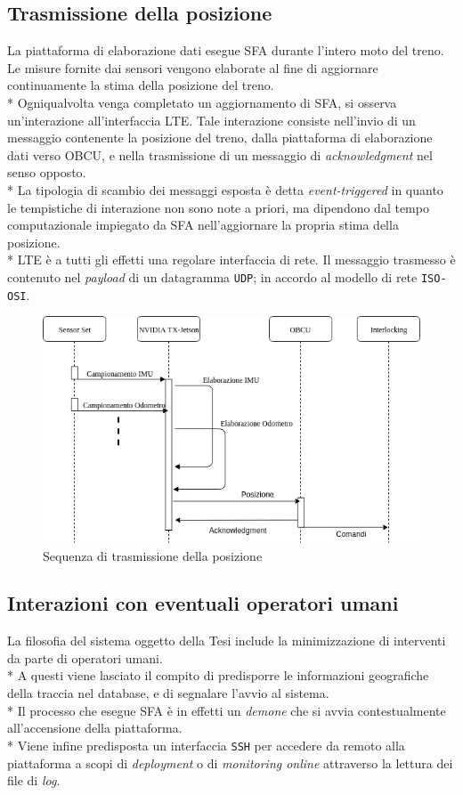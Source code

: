 	\subsection{Trasmissione della posizione}
	La piattaforma di elaborazione dati esegue SFA durante l'intero moto del treno. Le misure fornite dai sensori vengono elaborate al fine di aggiornare continuamente la stima della posizione del treno.\\*
	Ogniqualvolta venga completato un aggiornamento di SFA, si osserva un'interazione all'interfaccia LTE. Tale interazione consiste nell'invio di un messaggio contenente la posizione del treno, dalla piattaforma di elaborazione dati verso OBCU, e nella trasmissione di un messaggio di \emph{acknowledgment} nel senso opposto.\\*
	La tipologia di scambio dei messaggi esposta \`e detta \emph{event-triggered} \cite{evttimetriggered} in quanto le tempistiche di interazione non sono note a priori, ma dipendono dal tempo computazionale impiegato da SFA nell'aggiornare la propria stima della posizione.\\*
	LTE \`e a tutti gli effetti una regolare interfaccia di rete. Il messaggio trasmesso \`e contenuto nel \emph{payload} di un datagramma \texttt{UDP}; in accordo al modello di rete \texttt{ISO-OSI}. \cite{libroreti}
	\begin{figure}[h]
		\centering
		\includegraphics[width=0.7\linewidth]{img/seqdiag2}
		\caption{Sequenza di trasmissione della posizione}
		\label{fig:seqdiag2}
	\end{figure}
	\subsection{Interazioni con eventuali operatori umani}
	La filosofia del sistema oggetto della Tesi include la minimizzazione di interventi da parte di operatori umani.\\*
	A questi viene lasciato il compito di predisporre le informazioni geografiche della traccia nel database, e di segnalare l'avvio al sistema.\\*
	Il processo che esegue SFA \`e in effetti un \emph{demone} che si avvia contestualmente all'accensione della piattaforma.\\*
	Viene infine predisposta un interfaccia \texttt{SSH} per accedere da remoto alla piattaforma a scopi di \emph{deployment} o di \emph{monitoring online} attraverso la lettura dei file di \emph{log}.